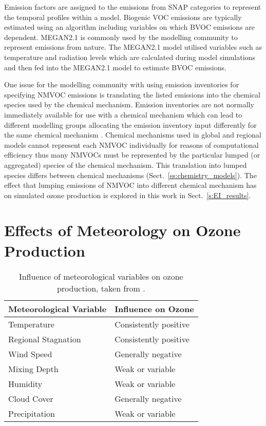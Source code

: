 Emission factors are assigned to the emissions from SNAP categories to represent the temporal profiles within a model.
Biogenic VOC emissions are typically estimated using an algorithm including variables on which BVOC emissions are dependent.
MEGAN2.1 \citep{Guenther:2012} is commonly used by the modelling community to represent emissions from nature.
The MEGAN2.1 model utilised variables such as temperature and radiation levels which are calculated during model simulations and then fed into the MEGAN2.1 model to estimate BVOC emissions.

One issue for the modelling community with using emission inventories for specifying NMVOC emissions is translating the listed emissions into the chemical species used by the chemical mechanism.
Emission inventories are not normally immediately available for use with a chemical mechanism which can lead to different modelling groups allocating the emission inventory input differently for the same chemical mechanism \citep{Carter:2015}.
Chemical mechanisms used in global and regional models cannot represent each NMVOC individually for reasons of computational efficiency thus many NMVOCs must be represented by the particular lumped (or aggregated) species of the chemical mechanism.
This translation into lumped species differs between chemical mechanisms (Sect.~\ref{ss:chemistry_models}).
The effect that lumping emissions of NMVOC into different chemical mechanism has on simulated ozone production is explored in this work in Sect.~\ref{s:EI_results}.

\section{Effects of Meteorology on Ozone Production} \label{s:meteo_ozone}
\begin{table}
    \centering
    \caption[Influence of meteorological variables on ozone production]{Influence of meteorological variables on ozone production, taken from \citet{Jacob:2009}.}
    \begin{tabular}{ll}
        \hline \hline
        \textbf{Meteorological Variable} & \textbf{Influence on Ozone} \\
        \hline \hline
        Temperature & Consistently positive \\
        Regional Stagnation & Consistently positive \\
        Wind Speed & Generally negative \\
        Mixing Depth & Weak or variable \\
        Humidity & Weak or variable \\
        Cloud Cover & Generally negative \\
        Precipitation & Weak or variable \\
        \hline \hline
    \end{tabular}
    \label{t:meteo_vars}
\end{table}

